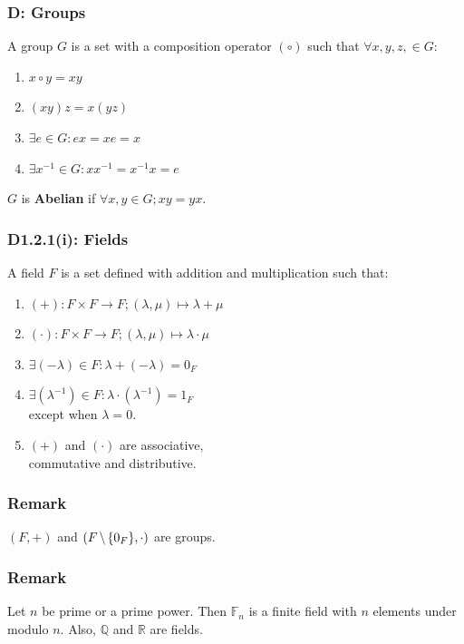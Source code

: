 \documentclass{article}
\begin{document}
\begin{multicols*}{3}
\subsubsection*{D: Groups}
A group $G$ is a set with a composition
operator $(\circ)$ such that $\forall x,y,z,\in G$:
\begin{enumerate}
    \item $x\circ y=xy$
    
    \item $(xy)z=x(yz)$
    
    \item $\exists e\in G: ex=xe=x$
    
    \item $\exists x^{-1}\in G: xx^{-1}=x^{-1}x=e$
\end{enumerate}
$G$ is \textbf{Abelian} if 
$\forall x,y\in G; xy=yx$.

\subsubsection*{D1.2.1(i): Fields}
A field $F$ is a set defined with addition
and multiplication such that:
\begin{enumerate}
    \item $(+):F\times F\rightarrow F;
    (\lambda,\mu)\mapsto\lambda+\mu$

    \item $(\cdot):F\times F\rightarrow F;
    (\lambda,\mu)\mapsto\lambda\cdot\mu$

    \item $\exists (-\lambda)\in F:
    \lambda+(-\lambda)=0_F$

    \item $\exists (\lambda^{-1})\in F:
    \lambda\cdot(\lambda^{-1})=1_F$ \\
    except when $\lambda=0$.

    \item $(+)$ and $(\cdot)$
    are associative, \\ commutative
    and distributive.
\end{enumerate}

\subsubsection*{Remark}
$(F,+)$ and $(F\hspace{0.02in}\backslash
\hspace{0.02in}\{0_F\},\cdot)$ are groups.

\subsubsection*{Remark}
Let $n$ be prime or a prime power.
Then $\mathbb{F}_n$ is a finite field with $n$ elements
under modulo $n$.
Also, $\mathbb{Q}$ and $\mathbb{R}$ are fields.


\end{multicols*}
\end{document}
